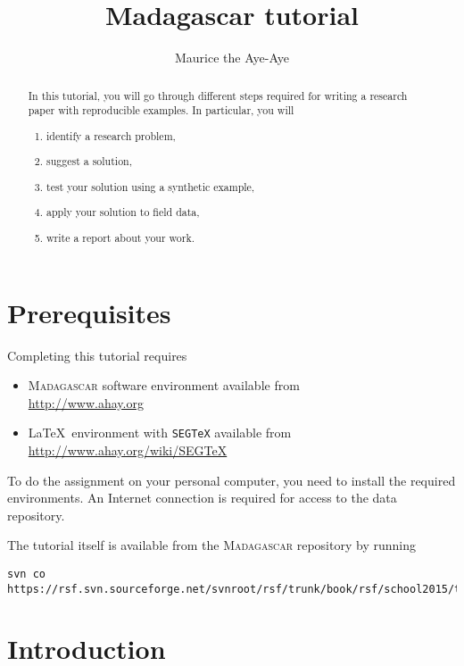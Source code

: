 \author{Maurice the Aye-Aye}
\title{Madagascar tutorial}


\maketitle

\begin{abstract}
  In this tutorial, you will go through different steps required for writing a research paper with reproducible examples. In particular, you will
  \begin{enumerate}
    \item identify a research problem,
    \item suggest a solution,
    \item test your solution using a synthetic example,
    \item apply your solution to field data,
    \item write  a report about your work.
  \end{enumerate}
\end{abstract}

\section{Prerequisites}

Completing this tutorial requires
\begin{itemize}
\item \textsc{Madagascar} software environment available from \\
\url{http://www.ahay.org}
\item \LaTeX\ environment with \texttt{SEGTeX} available from \\ 
\url{http://www.ahay.org/wiki/SEGTeX}
\end{itemize}
To do the assignment on your personal computer, you need to install
the required environments. An Internet connection is required for
access to the data repository.

The tutorial itself is available from the \textsc{Madagascar} repository
by running
\begin{verbatim}
svn co https://rsf.svn.sourceforge.net/svnroot/rsf/trunk/book/rsf/school2015/tutorial
\end{verbatim}

\section{Introduction}

